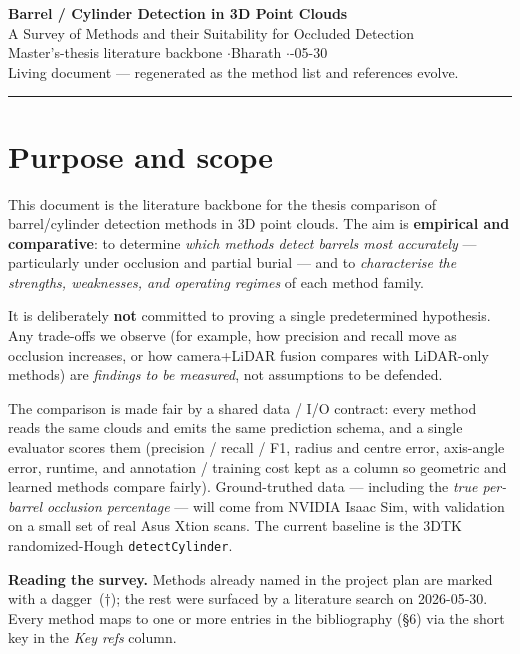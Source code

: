 \documentclass[10pt,a4paper]{article}
\begin{document}
\begin{center}
  {\LARGE\bfseries Barrel / Cylinder Detection in 3D Point Clouds}\\[2pt]
  {\large A Survey of Methods and their Suitability for Occluded Detection}\\[6pt]
  {\normalsize Master's-thesis literature backbone \quad$\cdot$\quad Bharath \quad$\cdot$-05-30}\\[2pt]
  {\small Living document --- regenerated as the method list and references evolve.}
\end{center}
\vspace{2pt}
\hrule
\vspace{8pt}

\section{Purpose and scope}

This document is the literature backbone for the thesis comparison of barrel/cylinder
detection methods in 3D point clouds. The aim is \textbf{empirical and comparative}: to
determine \emph{which methods detect barrels most accurately} --- particularly under
occlusion and partial burial --- and to \emph{characterise the strengths, weaknesses, and
operating regimes} of each method family.

It is deliberately \textbf{not} committed to proving a single predetermined hypothesis.
Any trade-offs we observe (for example, how precision and recall move as occlusion
increases, or how camera+LiDAR fusion compares with LiDAR-only methods) are
\emph{findings to be measured}, not assumptions to be defended.

The comparison is made fair by a shared data / I/O contract: every method reads the same
clouds and emits the same prediction schema, and a single evaluator scores them
(precision / recall / F1, radius and centre error, axis-angle error, runtime, and
annotation / training cost kept as a column so geometric and learned methods compare
fairly). Ground-truthed data --- including the \emph{true per-barrel occlusion percentage}
--- will come from NVIDIA Isaac Sim, with validation on a small set of real Asus Xtion
scans. The current baseline is the 3DTK randomized-Hough \texttt{detectCylinder}.

\textbf{Reading the survey.} Methods already named in the project plan are marked with a
dagger~($\dagger$); the rest were surfaced by a literature search on 2026-05-30. Every
method maps to one or more entries in the bibliography (\S6) via the short key in the
\emph{Key refs} column.
\end{document}
